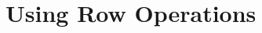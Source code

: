 \documentclass[pdf
]{beamer}
\begin{document}
{{\section{Using Row Operations}


%
%
%
%
%
%
%
%
%
%
%

}}
\end{document}
